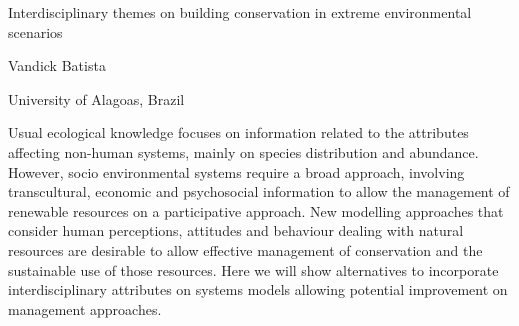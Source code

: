 \documentclass[a4paper]{article}
\begin{document}

\Large
\begin{center}
Interdisciplinary themes on building conservation in extreme environmental scenarios\\ 

\hspace{10pt}

\large
Vandick Batista

\hspace{10pt}

\small  
University of Alagoas, Brazil\\

\end{center}

\hspace{10pt}

\normalsize

Usual ecological knowledge focuses on information related to the attributes affecting non-human systems, mainly on species distribution and abundance. However,  socio environmental systems require a broad approach, involving transcultural, economic and psychosocial information to allow the management of renewable resources on a participative approach. New modelling approaches that consider human perceptions, attitudes and behaviour dealing with natural resources are desirable to allow effective management of conservation and the sustainable use of those resources. Here we will show alternatives to incorporate interdisciplinary attributes on systems models allowing potential improvement on management approaches.
\end{document}
